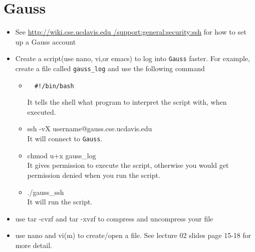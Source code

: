 \documentclass[10pt]{article}
\begin{document}
\section{Gauss}
\begin{itemize}
\item See 	\href{http://wiki.cse.ucdavis.edu/support:general:security:ssh}{http://wiki.cse.ucdavis.edu
    /support:general:security:ssh} for how to set up a Gauss account
\item Create a script(use nano, vi,or emacs) to log into \verb"Gauss" faster. For example, create a file called \verb"gauss_log" and use the following command
 \begin{itemize}
  \item \begin{verbatim}
  #!/bin/bash
  \end{verbatim}
  It tells the shell what program to interpret the script with, when executed.
  \item \textsf{ssh -vX username@gauss.cse.ucdavis.edu} \\
  It will connect to \verb"Gauss".
  \item \textsf{chmod u+x gauss\_log}  \\
  It gives permission to execute the script, otherwise you would get permission denied when you run the script.
  \item \textsf{./gauss\_ssh}  \\
  It will run the script.
 \end{itemize} 
\item use \textsf{tar -cvzf} and \textsf{tar -xvzf} to compress and uncompress your file
\item use \textsf{nano} and \textsf{vi(m)} to create/open a file. See lecture 02 slides page 15-18 for more detail.
\end{itemize} 
\end{document}
